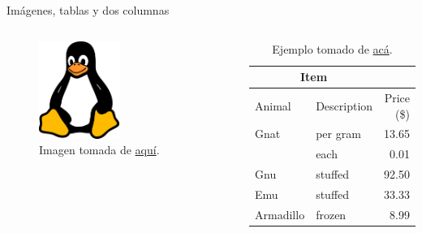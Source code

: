\documentclass[spanish,mexico]{beamer}
\begin{document}
		\begin{frame}{Imágenes, tablas y dos columnas}
		\begin{columns}
			\begin{figure}
				\caption{Imagen tomada de \href{https://www.picpng.com/linux-unix-tux-penguin-cute-png-43298}{aquí}.}
				\centering
				\includegraphics[width=0.5\textwidth]{tux}
			\end{figure}
			\begin{table}[]
				\begin{tabular}{@{}llr@{}}
					\toprule
					\multicolumn{2}{c}{Item} &            \\ \midrule
					Animal     & Description & Price (\$) \\ \midrule
					Gnat       & per gram    & 13.65      \\
					& each        & 0.01       \\
					Gnu        & stuffed     & 92.50      \\
					Emu        & stuffed     & 33.33      \\
					Armadillo  & frozen      & 8.99       \\ \bottomrule
				\end{tabular}
				\caption{Ejemplo tomado de \href{https://www.tablesgenerator.com/}{acá}.}
				\label{tab:my-table}
			\end{table}
		\end{columns}
	\end{frame}
\end{document}
